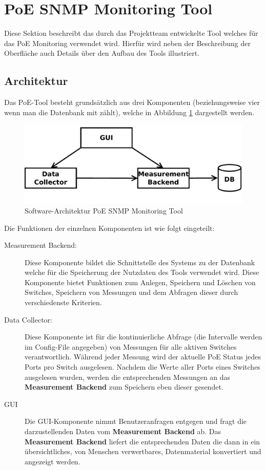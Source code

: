 \section{PoE SNMP Monitoring Tool}
\label{sec:tool}
Diese Sektion beschreibt das durch das Projektteam entwickelte Tool welches für das PoE Monitoring verwendet wird.
Hierfür wird neben der Beschreibung der Oberfläche auch Details über den Aufbau des Tools illustriert.

\subsection{Architektur}

Das PoE-Tool besteht grundsätzlich aus drei Komponenten (beziehungsweise vier wenn man die Datenbank mit zählt), welche in Abbildung \ref{fig:architecture} dargestellt werden. 

\begin{figure}[h]
    \centering
    \leavevmode
    \includegraphics[width=1.0\linewidth]{figures/architecture_new}
    \caption{Software-Architektur PoE SNMP Monitoring Tool}
    \label{fig:architecture}
\end{figure}

Die Funktionen der einzelnen Komponenten ist wie folgt eingeteilt:

\begin{description}
  \item[Measurement Backend:] Diese Komponente bildet die Schnittstelle des Systems zu der Datenbank welche für die Speicherung der Nutzdaten des Tools verwendet wird. Diese Komponente bietet Funktionen zum Anlegen, Speichern und Löschen von Switches, Speichern von Messungen und dem Abfragen dieser durch verschiedenste Kriterien.
  \item[Data Collector:] Diese Komponente ist für die kontinuierliche Abfrage (die Intervalle werden im Config-File angegeben) von Messungen für alle aktiven Switches verantwortlich. Während jeder Messung wird der aktuelle PoE Status jedes Ports pro Switch ausgelesen. Nachdem die Werte aller Ports eines Switches ausgelesen wurden, werden die entsprechenden Messungen an das \textbf{Measurement Backend} zum Speichern eben dieser gesendet.
  \item [GUI] Die GUI-Komponente nimmt Benutzeranfragen entgegen und fragt die darzustellenden Daten vom \textbf{Measurement Backend} ab. Das \textbf{Measurement Backend} liefert die entsprechenden Daten die dann in ein übersichtliches, von Menschen verwertbares, Datenmaterial konvertiert und angezeigt werden.
\end{description}

